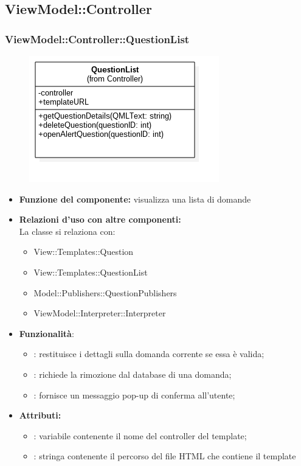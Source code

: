 \subsection{ViewModel::Controller}
\subsubsection{ViewModel::Controller::QuestionList}
\begin{figure}[h!]
\begin{center}
	\includegraphics[scale=0.6]{../images/ViewModel/Controller/QuestionList.png}
\end{center}
\end{figure}
\begin{itemize}
\item\textbf{Funzione del componente:} visualizza una lista di domande
				\item\textbf{Relazioni d'uso con altre componenti:} \\
La classe si relaziona con:
	\begin{itemize}
		\item View::Templates::Question
		\item View::Templates::QuestionList
		\item Model::Publishers::QuestionPublishers
		\item ViewModel::Interpreter::Interpreter	
	\end{itemize}
\item\textbf{Funzionalità}:
\begin{itemize}
		\item{}: restituisce i dettagli sulla domanda corrente se essa è valida;\\
		\item{}: richiede la rimozione dal database di una domanda;\\
		\item{}: fornisce un messaggio pop-up di conferma all'utente;\\
	\end{itemize}
	\item\textbf{Attributi:}
	\begin{itemize}
	\item{}: variabile contenente il nome del controller del template;\\
 
 	\item{}: stringa contenente il percorso del file HTML che contiene il template\\
	\end{itemize}
\end{itemize}
